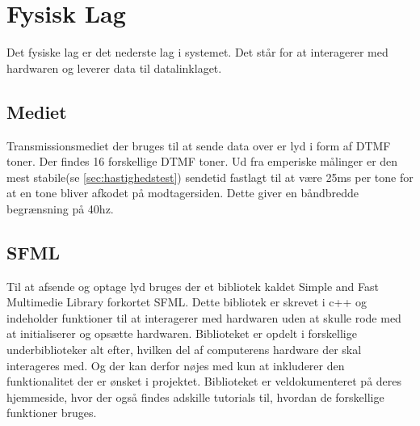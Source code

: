 \section{Fysisk Lag}
Det fysiske lag er det nederste lag i systemet. Det står for at interagerer med hardwaren og leverer data til datalinklaget. 

\subsection{Mediet}
Transmissionsmediet der bruges til at sende data over er lyd i form af DTMF toner. Der findes 16 forskellige DTMF toner. Ud fra emperiske målinger er den mest stabile(se \ref{sec:hastighedstest}) sendetid fastlagt til at være 25ms per tone for at en tone bliver afkodet på modtagersiden. Dette giver en båndbredde begrænsning på 40hz.

\subsection{SFML}
Til at afsende og optage lyd bruges der et bibliotek kaldet Simple and Fast Multimedie Library forkortet SFML. Dette bibliotek er skrevet i c++ og indeholder funktioner til at interagerer med hardwaren uden at skulle rode med at initialiserer og opsætte hardwaren. Biblioteket er opdelt i forskellige underbiblioteker alt efter, hvilken del af computerens hardware der skal interageres med. Og der kan derfor nøjes med kun at inkluderer den funktionalitet der er ønsket i projektet. Biblioteket er veldokumenteret på deres hjemmeside, hvor der også findes adskille tutorials til, hvordan de forskellige funktioner bruges.

